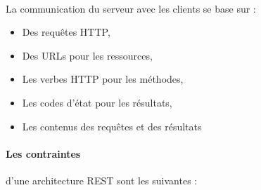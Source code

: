 \documentclass{report}
\begin{document}
\paragraph{}
La communication du serveur avec les clients se base sur : 

\begin{itemize}
\item Des requêtes HTTP,
\item Des URLs pour les ressources,
\item Les verbes HTTP pour les méthodes,
\item Les codes d'état pour les résultats,
\item Les contenus des requêtes et des résultats 
\end{itemize}

\paragraph{Les contraintes} 
d'une architecture REST sont les suivantes :
\end{document}
